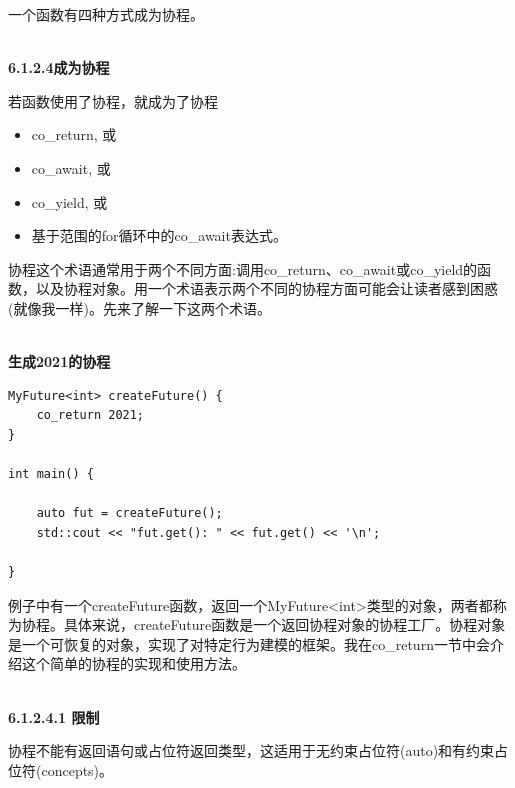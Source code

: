一个函数有四种方式成为协程。

\hspace*{\fill} \\ %
\noindent
\textbf{6.1.2.4\hspace{0.2cm}成为协程}

若函数使用了协程，就成为了协程

\begin{itemize}
\item 
co\_return, 或

\item 
co\_await, 或

\item 
co\_yield, 或

\item 
基于范围的for循环中的co\_await表达式。
\end{itemize}

\begin{tcolorbox}[breakable,enhanced jigsaw,colback=red!5!white,colframe=red!75!black,title={协程工厂和协程对象的区别}]
	
协程这个术语通常用于两个不同方面:调用co\_return、co\_await或co\_yield的函数，以及协程对象。用一个术语表示两个不同的协程方面可能会让读者感到困惑(就像我一样)。先来了解一下这两个术语。

\hspace*{\fill} \\ %
\noindent
\textbf{生成2021的协程}
\begin{lstlisting}[style=styleCXX]
MyFuture<int> createFuture() {
	co_return 2021;
}

int main() {
	
	auto fut = createFuture();
	std::cout << "fut.get(): " << fut.get() << '\n';
	
}
\end{lstlisting}

例子中有一个createFuture函数，返回一个MyFuture<int>类型的对象，两者都称为协程。具体来说，createFuture函数是一个返回协程对象的协程工厂。协程对象是一个可恢复的对象，实现了对特定行为建模的框架。我在co\_return一节中会介绍这个简单的协程的实现和使用方法。
	
\end{tcolorbox}

\hspace*{\fill} \\ %
\noindent
\textbf{6.1.2.4.1 \hspace{0.2cm}限制}

协程不能有返回语句或占位符返回类型，这适用于无约束占位符(auto)和有约束占位符(concepts)。

